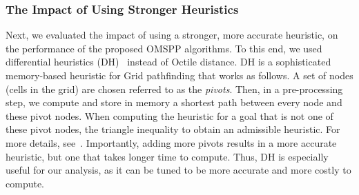 \documentclass[smallextended]{svjour3}       %
\newcommand{\omspp}{\ac{OMSPP}\xspace}
\newcommand{\kastarvar}[1]{\textup{kA}$^*_{#1}$\xspace}
\newcommand{\kastarmin}{\kastarvar{\min}}
\newcommand{\kxastar}{k$\times$A$^*$\xspace}
\begin{document}
\subsubsection{The Impact of Using Stronger Heuristics}


Next, we evaluated the impact of using a stronger, more accurate heuristic, on the performance of the proposed \omspp algorithms.
To this end, we used differential heuristics (DH)~\cite{goldberg2005computing,ng2002predicting,SturtevantFBSN2009} instead of Octile distance.
DH is a sophisticated memory-based heuristic for Grid pathfinding that works as follows.
A set of nodes (cells in the grid) are chosen  referred to as the \emph{pivots}. 
Then, in a pre-processing step, we compute and store in memory a shortest path between every node and these pivot nodes. 
When computing the heuristic for a goal that is not one of these pivot nodes, the triangle inequality to obtain an admissible heuristic. 
For more details, see~\cite{goldberg2005computing,ng2002predicting,SturtevantFBSN2009}. Importantly, adding more pivots results in a more accurate heuristic, but one that takes longer time to compute. Thus, DH is especially useful for our analysis, as it can be tuned to be more accurate and more costly to compute.
\end{document}
